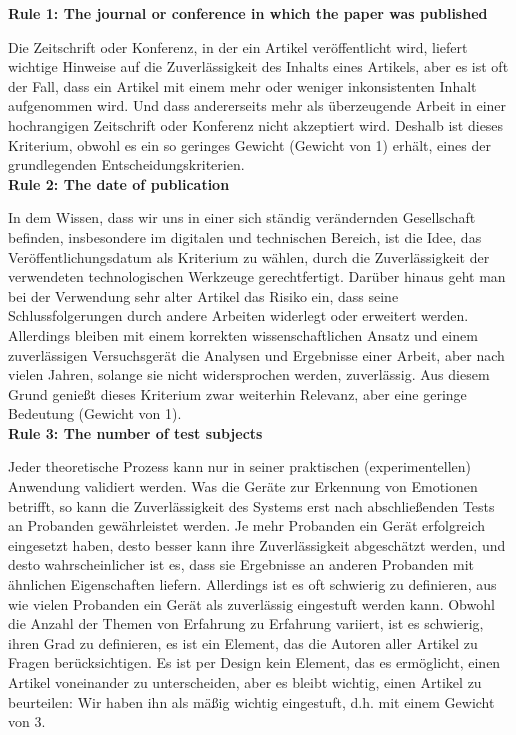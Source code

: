 \textbf{Rule 1: The journal or conference in which the paper was published}

Die Zeitschrift oder Konferenz, in der ein Artikel veröffentlicht wird, liefert wichtige Hinweise auf die Zuverlässigkeit des Inhalts eines Artikels, aber es ist oft der Fall, dass ein Artikel mit einem mehr oder weniger inkonsistenten Inhalt aufgenommen wird. 
Und dass andererseits mehr als überzeugende Arbeit in einer hochrangigen Zeitschrift oder Konferenz nicht akzeptiert wird. 
Deshalb ist dieses Kriterium, obwohl es ein so geringes Gewicht (Gewicht von 1) erhält, eines der grundlegenden Entscheidungskriterien. \\


\textbf{Rule 2: The date of publication}

In dem Wissen, dass wir uns in einer sich ständig verändernden Gesellschaft befinden, insbesondere im digitalen und technischen Bereich, ist die Idee, das Veröffentlichungsdatum als Kriterium zu wählen, durch die Zuverlässigkeit der verwendeten technologischen Werkzeuge gerechtfertigt. 
Darüber hinaus geht man bei der Verwendung sehr alter Artikel das Risiko ein, dass seine Schlussfolgerungen durch andere Arbeiten widerlegt oder erweitert werden. 
Allerdings bleiben mit einem korrekten wissenschaftlichen Ansatz und einem zuverlässigen Versuchsgerät die Analysen und Ergebnisse einer Arbeit, aber nach vielen Jahren, solange sie nicht widersprochen werden, zuverlässig. 
Aus diesem Grund genießt dieses Kriterium zwar weiterhin Relevanz, aber eine geringe Bedeutung (Gewicht von 1). \\


\textbf{Rule 3: The number of test subjects}

Jeder theoretische Prozess kann nur in seiner praktischen (experimentellen) Anwendung validiert werden. 
Was die Geräte zur Erkennung von Emotionen betrifft, so kann die Zuverlässigkeit des Systems erst nach abschließenden Tests an Probanden gewährleistet werden. 
Je mehr Probanden ein Gerät erfolgreich eingesetzt haben, desto besser kann ihre Zuverlässigkeit abgeschätzt werden, und desto wahrscheinlicher ist es, dass sie Ergebnisse an anderen Probanden mit ähnlichen Eigenschaften liefern. 
Allerdings ist es oft schwierig zu definieren, aus wie vielen Probanden ein Gerät als zuverlässig eingestuft werden kann. 
Obwohl die Anzahl der Themen von Erfahrung zu Erfahrung variiert, ist es schwierig, ihren Grad zu definieren, es ist ein Element, das die Autoren aller Artikel zu Fragen berücksichtigen. 
Es ist per Design kein Element, das es ermöglicht, einen Artikel voneinander zu unterscheiden, aber es bleibt wichtig, einen Artikel zu beurteilen: 
Wir haben ihn als mäßig wichtig eingestuft, d.h. mit einem Gewicht von 3. \\


